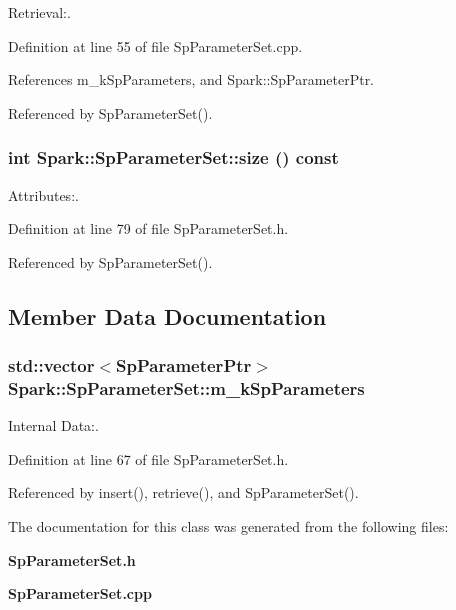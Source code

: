 Retrieval:. 

Definition at line 55 of file Sp\-Parameter\-Set.cpp.

References m\_\-k\-Sp\-Parameters, and Spark::Sp\-Parameter\-Ptr.

Referenced by Sp\-Parameter\-Set().
\subsubsection{\setlength{\rightskip}{0pt plus 5cm}int Spark::Sp\-Parameter\-Set::size () const\hspace{0.3cm}{\tt  [inline]}}\label{classSpark_1_1SpParameterSet_a7}


Attributes:. 

Definition at line 79 of file Sp\-Parameter\-Set.h.

Referenced by Sp\-Parameter\-Set().

\subsection{Member Data Documentation}
\subsubsection{\setlength{\rightskip}{0pt plus 5cm}std::vector$<${\bf Sp\-Parameter\-Ptr}$>$ {\bf Spark::Sp\-Parameter\-Set::m\_\-k\-Sp\-Parameters}\hspace{0.3cm}{\tt  [protected]}}\label{classSpark_1_1SpParameterSet_p0}


Internal Data:. 

Definition at line 67 of file Sp\-Parameter\-Set.h.

Referenced by insert(), retrieve(), and Sp\-Parameter\-Set().

The documentation for this class was generated from the following files:\begin{CompactItemize}
\item 
{\bf Sp\-Parameter\-Set.h}\item 
{\bf Sp\-Parameter\-Set.cpp}\end{CompactItemize}
